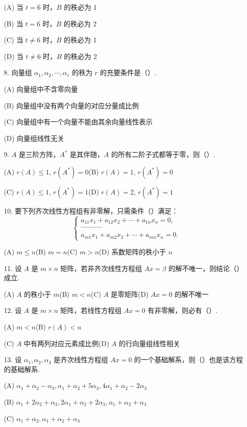 \documentclass[UTF8, 12pt, fontset=fandol, oneside]{ctexart}
\begin{document}
(A) 当 $t=6$ 时，$B$ 的秩必为 1

(B) 当 $t=6$ 时，$B$ 的秩必为 2

(C) 当 $t\ne 6$ 时，$B$ 的秩必为 1

(D) 当 $t\ne 6$ 时，$B$ 的秩必为 2

8. 向量组 $\alpha_1,\alpha_2,\cdots,\alpha_r$ 的秩为 $r$ 的充要条件是（\quad）.

(A) 向量组中不含零向量

(B) 向量组中没有两个向量的对应分量成比例

(C) 向量组中有一个向量不能由其余向量线性表示

(D) 向量组线性无关

9. $A$ 是三阶方阵，$A^*$ 是其伴随，$A$ 的所有二阶子式都等于零，则（\quad）.

(A) $r(A)\le 1$, $r(A^*)=0$\qquad (B) $r(A)=1$, $r(A^*)=0$

(C) $r(A)\le 1$, $r(A^*)=1$\qquad (D) $r(A)=2$, $r(A^*)=1$

10. 要下列齐次线性方程组有非零解，只需条件（\quad）满足：
\[
\begin{cases}
a_{11}x_1+a_{12}x_2+\cdots+a_{1n}x_n=0,\\
\cdots\cdots\cdots\cdots\\
a_{m1}x_1+a_{m2}x_2+\cdots+a_{mn}x_n=0.
\end{cases}
\]

(A) $m\le n$\qquad (B) $m=n$\qquad (C) $m>n$\qquad (D) 系数矩阵的秩小于 $n$

11. 设 $A$ 是 $m\times n$ 矩阵，若非齐次线性方程组 $Ax=\beta$ 的解不唯一，则结论（\quad）成立.

(A) $A$ 的秩小于 $m$\qquad (B) $m<n$\qquad (C) $A$ 是零矩阵\qquad (D) $Ax=0$ 的解不唯一

12. 设 $A$ 是 $m\times n$ 矩阵，若线性方程组 $Ax=0$ 有非零解，则必有（\quad）.

(A) $m<n$\qquad (B) $r(A)<n$

(C) $A$ 中有两列对应元素成比例\qquad (D) $A$ 的行向量组线性相关

13. 设 $\alpha_1,\alpha_2,\alpha_3$ 是齐次线性方程组 $Ax=0$ 的一个基础解系，则（\quad）也是该方程的基础解系.

(A) $\alpha_1+\alpha_2-\alpha_3,\alpha_1+\alpha_2+5\alpha_3,4\alpha_1+\alpha_2-2\alpha_3$

(B) $\alpha_1+2\alpha_2+\alpha_3,2\alpha_1+\alpha_2+2\alpha_3,\alpha_1+\alpha_2+\alpha_3$

(C) $\alpha_1+\alpha_2,\alpha_1+\alpha_2+\alpha_3$
\end{document}
